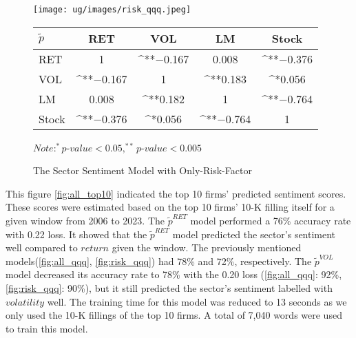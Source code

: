 \documentclass[logo,bsc,singlespacing,parskip]{infthesis}
\begin{document}
\begin{figure}[p]
\centering
\begin{minipage}{0.90\textwidth}
    \centering
    \texttt{[image: ug/images/risk\_qqq.jpeg]}
    \caption{The Sector Sentiment Model with Only-Risk-Factor}
    \label{fig:risk_qqq}
\end{minipage}%
\hfill
\vspace{10pt} %
\begin{minipage}{0.9\textwidth}
    \begin{minipage}[p]{0.9\textwidth}
    \centering
    \begin{tabular}{lcccc}
    \label{tab:risk_qqq_corr}
    $\tilde{p}$      & RET       & VOL       & LM        & Stock    \\ \hline
    RET    & 1  & ^{**}$-$0.167  & 0.008 & ^{**}$-$0.376 \\
    VOL    & ^{**}$-$0.167   & 1  & ^{**}0.183 & ^{*}0.056  \\
    LM    & 0.008 & ^{**}0.182 & 1  & ^{**}$-$0.764 \\
    Stock  & ^{**}$-$0.376 & ^{*}0.056  & ^{**}$-$0.764 & 1  \\ \hline
    \end{tabular}
    \medskip
    $\textit{Note}: ^{*}p$-$value<0.05, ^{**}p$-$value<0.005$
    \end{minipage}
\end{minipage}
\end{figure}


This figure \ref{fig:all_top10} indicated the top 10 firms’ predicted sentiment scores. These scores were estimated based on the top 10 firms’ 10-K filling itself for a given window from 2006 to 2023.  The $\tilde{p}^{RET}$ model performed a 76\% accuracy rate with 0.22 loss. It showed that the $\tilde{p}^{RET}$ model predicted the sector’s sentiment well compared to $return$ given the window.  The previously mentioned models(\ref{fig:all_qqq}, \ref{fig:risk_qqq}) had 78\% and 72\%, respectively. The $\tilde{p}^{VOL}$ model decreased its accuracy rate to 78\% with the 0.20 loss (\ref{fig:all_qqq}: 92\%, \ref{fig:risk_qqq}: 90\%), but it still predicted the sector’s sentiment labelled with $volatility$ well. The training time for this model was reduced to 13 seconds as we only used the 10-K fillings of the top 10 firms. A total of 7,040 words were used to train this model. 
\end{document}
